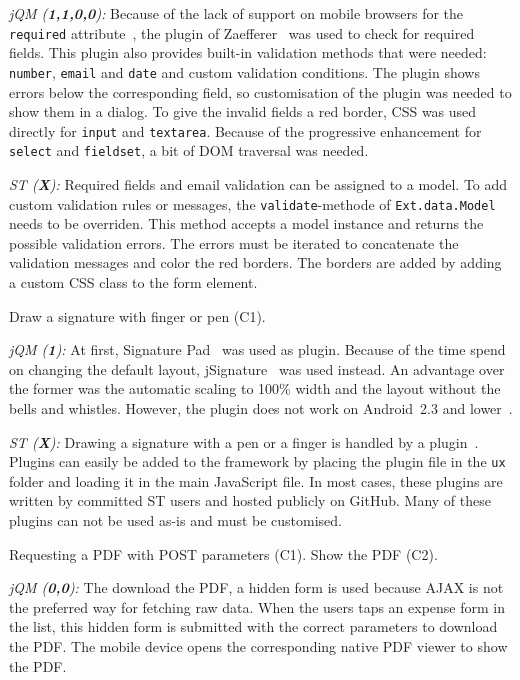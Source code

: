 \documentclass[a4paper]{artikel3}
\newcommand{\code}[1]{\texttt{#1}}
\renewcommand{\paragraph}[1]{\vspace{2mm} \noindent {\bf #1}  }
\newcommand{\framework}[2]{ \emph{#1 (\textbf{#2}): }} %
\newcommand{\challenge}[1]{\paragraph{#1}}
\begin{document}
\framework{jQM}{1,1,0,0}
Because of the lack of support on mobile browsers for the \code{required} attribute~\cite{Deveria2013}, the plugin of Zaefferer~\cite{Zaefferer2013} was used to check for required fields.
This plugin also provides built-in validation methods that were needed: \code{number}, \code{email} and \code{date} and custom validation conditions.
The plugin shows errors below the corresponding field, so customisation of the plugin was needed to show them in a dialog.
To give the invalid fields a red border, CSS was used directly for \code{input} and \code{textarea}.
Because of the progressive enhancement for \code{select} and \code{fieldset}, a bit of DOM traversal was needed.

\framework{ST}{X}
Required fields and email validation can be assigned to a model.  To add custom validation rules or messages,  the \code{validate}-methode of \code{Ext.data.Model} needs to be overriden.  This method accepts a model instance and returns the possible validation errors.  The errors must be iterated to concatenate the validation messages and color the red borders.  The borders are added by adding a custom CSS class to the form element.

\challenge{Signature (C1)}
Draw a signature with finger or pen (C1).

\framework{jQM}{1}
At first, Signature Pad~\cite{Bradley2013} was used as plugin.
Because of the time spend on changing the default layout, jSignature~\cite{Systems2013} was used instead.
An advantage over the former was the automatic scaling to 100\% width and the layout without the bells and whistles.
However, the plugin does not work on Android~2.3 and lower~\cite{Systems2013}.

\framework{ST}{X}
Drawing a signature with a pen or a finger is handled by a plugin~\cite{SimFla2011}.  Plugins can easily be added to the framework by placing the plugin file in the \code{ux} folder and loading it in the main JavaScript file.  In most cases,  these plugins are written by committed ST users and hosted publicly on GitHub. Many of these plugins can not be used as-is and must be customised.

\challenge{Show PDF (C1,C2)}
Requesting a PDF with POST parameters (C1).
Show the PDF (C2).

\framework{jQM}{0,0}
The download the PDF, a hidden form is used because AJAX is not the preferred way for fetching raw data.
When the users taps an expense form in the list, this hidden form is submitted with the correct parameters to download the PDF.
The mobile device opens the corresponding native PDF viewer to show the PDF.
\end{document}

